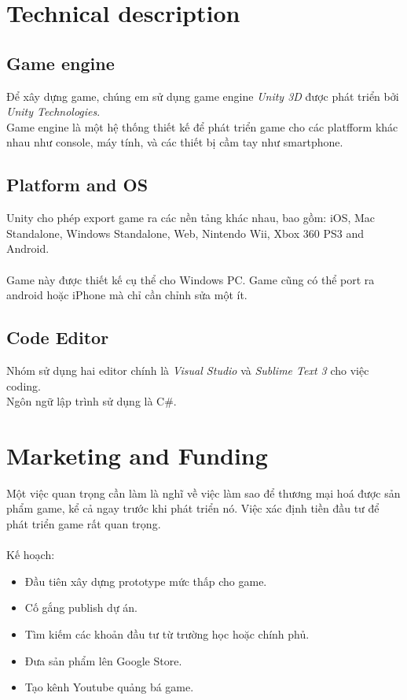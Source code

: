 \documentclass[14pt,a4paper]{extreport}
\begin{document}
\chapter{Technical description}
\section{Game engine}
 Để xây dựng game, chúng em sử dụng game engine \textit{Unity 3D} được phát triển bởi \textit{Unity Technologies}. \\
 Game engine là một hệ thống thiết kế để phát triển game cho các platfform khác nhau như console, máy tính, và các thiết bị cầm tay như smartphone.
 

\section{Platform and OS}
Unity cho phép export game ra các nền tảng khác nhau, bao gồm: iOS, Mac
Standalone, Windows Standalone, Web, Nintendo Wii, Xbox 360 PS3 and Android.
\\
\\
Game này được thiết kế cụ thể cho Windows PC. Game cũng có thể port ra android hoặc iPhone mà chỉ cần chỉnh sửa một ít.

\section{Code Editor}
Nhóm sử dụng hai editor chính là \textit{Visual Studio} và \textit{Sublime Text 3} cho việc coding. \\
Ngôn ngữ lập trình sử dụng là C\#.




\chapter{Marketing and Funding}
Một việc quan trọng cần làm là nghĩ về việc làm sao để thương mại hoá được sản phẩm game, kể cả ngay trước khi phát triển nó. Việc xác định tiền đầu tư để phát triển game rất quan trọng.\\
\\
Kế hoạch:
\begin{itemize}
	\item Đầu tiên xây dựng prototype mức thấp cho game.
	\item Cố gắng publish dự án.
	\item Tìm kiếm các khoản đầu tư từ trường học hoặc chính phủ.
	\item Đưa sản phẩm lên Google Store.
	\item Tạo kênh Youtube quảng bá game.
\end{itemize}
\end{document}
